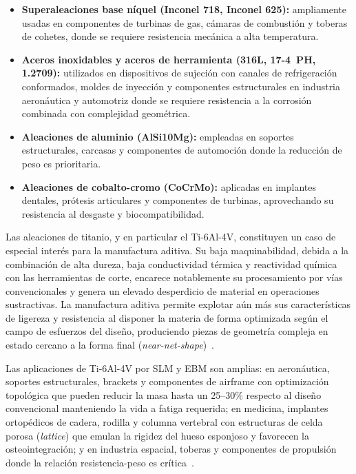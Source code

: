\begin{itemize}
	\item \textbf{Superaleaciones base níquel (Inconel 718, Inconel 625):} 
	ampliamente usadas en componentes de turbinas de gas, cámaras de 
	combustión y toberas de cohetes, donde se requiere resistencia mecánica 
	a alta temperatura. 
	
	\item \textbf{Aceros inoxidables y aceros de herramienta (316L, 
		17-4~PH, 1.2709):} utilizados en dispositivos de sujeción con canales de refrigeración 
	conformados, moldes de inyección y componentes estructurales en 
	industria aeronáutica y automotriz donde se requiere resistencia a la 
	corrosión combinada con complejidad geométrica.
	
	\item \textbf{Aleaciones de aluminio (AlSi10Mg):} empleadas en 
	soportes estructurales, carcasas y componentes de automoción donde 
	la reducción de peso es prioritaria.
	
	\item \textbf{Aleaciones de cobalto-cromo (CoCrMo):} aplicadas en 
	implantes dentales, prótesis articulares y componentes de turbinas, 
	aprovechando su resistencia al desgaste y biocompatibilidad.
\end{itemize}

Las aleaciones de titanio, y en particular el Ti-6Al-4V, constituyen un 
caso de especial interés para la manufactura aditiva. Su baja maquinabilidad, 
debida a la combinación de alta dureza, baja conductividad térmica y 
reactividad química con las herramientas de corte, encarece notablemente 
su procesamiento por vías convencionales y genera un elevado desperdicio 
de material en operaciones sustractivas. La manufactura aditiva permite 
explotar aún más sus características de ligereza y resistencia al disponer 
la materia de forma optimizada según el campo de esfuerzos del diseño, 
produciendo piezas de geometría compleja en estado cercano a la forma 
final (\textit{near-net-shape})~\cite{Leyens2003, Herzog2016}.

Las aplicaciones de Ti-6Al-4V por SLM y EBM son amplias: en aeronáutica, 
soportes estructurales, brackets y componentes de airframe con optimización 
topológica que pueden reducir la masa hasta un 25--30\% respecto al diseño 
convencional manteniendo la vida a fatiga requerida; en medicina, implantes 
ortopédicos de cadera, rodilla y columna vertebral con estructuras de 
celda porosa (\textit{lattice}) que emulan la rigidez del hueso esponjoso 
y favorecen la osteointegración; y en industria espacial, toberas y 
componentes de propulsión donde la relación resistencia-peso es 
crítica~\cite{Herzog2016}.


